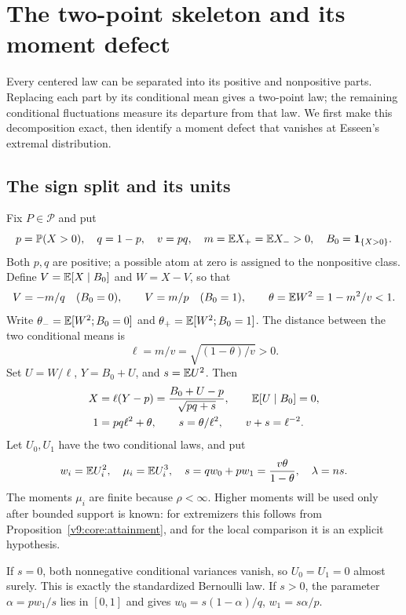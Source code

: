 \section{The two-point skeleton and its moment defect}
\label{ms:geometry-counts}

Every centered law can be separated into its positive and nonpositive
parts. Replacing each part by its conditional mean gives a two-point law;
the remaining conditional fluctuations measure its departure from that
law. We first make this decomposition exact, then identify a moment
defect that vanishes at Esseen's extremal distribution.

\subsection{The sign split and its units}

Fix $P\in\mathcal P$ and put
\[
 p=\mathbb P(X>0),\quad q=1-p,\quad v=pq,\quad
 m=\mathbb E X_+=\mathbb E X_->0,\quad B_0=\mathbf1_{\{X>0\}}.
\]
Both $p,q$ are positive; a possible atom at zero is assigned to the
nonpositive class. Define $V=\mathbb E[X\mid B_0]$ and $W=X-V$, so that
\[
 V=-m/q\quad(B_0=0),\qquad V=m/p\quad(B_0=1),\qquad
 \theta=\mathbb E W^2=1-m^2/v<1.
\]
Write $\theta_-=\mathbb E[W^2;B_0=0]$ and $\theta_+=\mathbb E[W^2;B_0=1]$.
The distance between the two conditional means is
\[
 \ell=m/v=\sqrt{(1-\theta)/v}>0.
\]
Set $U=W/\ell$, $Y=B_0+U$, and $s=\mathbb E U^2$. Then
\begin{subequations}\label{ms:bernoulli-coordinates}
\begin{align}
 X&=\ell(Y-p)=\frac{B_0+U-p}{\sqrt{pq+s}},\qquad
 \mathbb E[U\mid B_0]=0,\label{revision:canonical-decomposition}\\
 1&=pq\ell^2+\theta,\qquad s=\theta/\ell^2,\qquad
 v+s=\ell^{-2}.\label{short:acq:normalization}
\end{align}
\end{subequations}
Let $U_0,U_1$ have the two conditional laws, and put
\[
 w_i=\mathbb E U_i^2,\quad \mu_i=\mathbb E U_i^3,\quad
 s=qw_0+pw_1=\frac{v\theta}{1-\theta},\quad
 \lambda=ns.
\]
The moments $\mu_i$ are finite because $\rho<\infty$. Higher moments
will be used only after bounded support is known: for extremizers this
follows from Proposition~\ref{v9:core:attainment}, and for the local
comparison it is an explicit hypothesis.

If $s=0$, both nonnegative conditional variances vanish, so $U_0=U_1=0$
almost surely. This is exactly the standardized Bernoulli law. If $s>0$,
the parameter $\alpha=pw_1/s$ lies in $[0,1]$ and gives
$w_0=s(1-\alpha)/q$, $w_1=s\alpha/p$.

